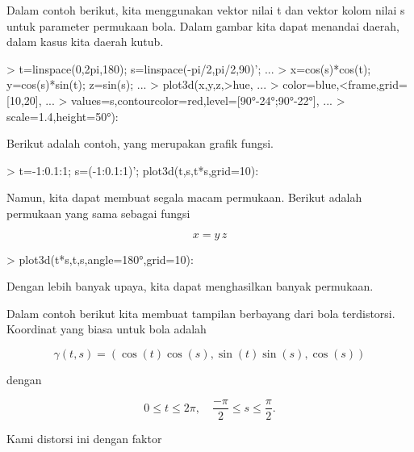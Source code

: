 \documentclass[a4paper,10pt]{article}
\begin{document}
\begin{eulernotebook}
\begin{eulercomment}
\begin{eulercomment}
\begin{eulercomment}
Dalam contoh berikut, kita menggunakan vektor nilai t dan vektor kolom
nilai s untuk parameter permukaan bola. Dalam gambar kita dapat
menandai daerah, dalam kasus kita daerah kutub.
\end{eulercomment}
\begin{eulerprompt}
> t=linspace(0,2pi,180); s=linspace(-pi/2,pi/2,90)'; ...
> x=cos(s)*cos(t); y=cos(s)*sin(t); z=sin(s); ...
> plot3d(x,y,z,>hue, ...
> color=blue,<frame,grid=[10,20], ...
> values=s,contourcolor=red,level=[90°-24°;90°-22°], ...
> scale=1.4,height=50°):
\end{eulerprompt}
\begin{eulercomment}
Berikut adalah contoh, yang merupakan grafik fungsi.
\end{eulercomment}
\begin{eulerprompt}
> t=-1:0.1:1; s=(-1:0.1:1)'; plot3d(t,s,t*s,grid=10):
\end{eulerprompt}
\begin{eulercomment}
Namun, kita dapat membuat segala macam permukaan. Berikut adalah
permukaan yang sama sebagai fungsi

\end{eulercomment}
\begin{eulerformula}
\[
x = y \, z
\]
\end{eulerformula}
\begin{eulerprompt}
> plot3d(t*s,t,s,angle=180°,grid=10):
\end{eulerprompt}
\begin{eulercomment}
Dengan lebih banyak upaya, kita dapat menghasilkan banyak permukaan.

Dalam contoh berikut kita membuat tampilan berbayang dari bola
terdistorsi. Koordinat yang biasa untuk bola adalah

\end{eulercomment}
\begin{eulerformula}
\[
\gamma(t,s) = (\cos(t)\cos(s),\sin(t)\sin(s),\cos(s))
\]
\end{eulerformula}
\begin{eulercomment}
dengan

\end{eulercomment}
\begin{eulerformula}
\[
0 \le t \le 2\pi, \quad \frac{-\pi}{2} \le s \le \frac{\pi}{2}.
\]
\end{eulerformula}
\begin{eulercomment}
Kami distorsi ini dengan faktor


\end{eulercomment}
\end{eulercomment}
\end{eulercomment}
\end{eulernotebook}
\end{document}
